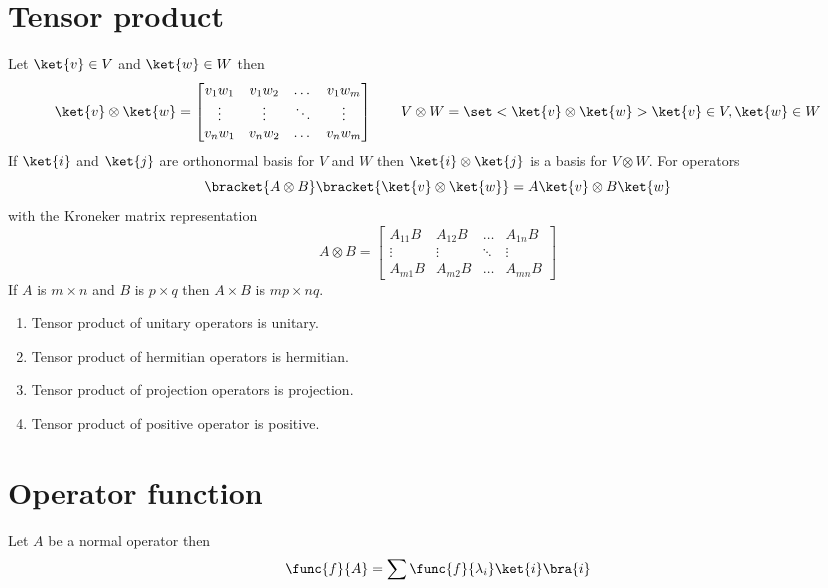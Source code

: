 \section{Tensor product}
Let \(\ket{v} \in V\) and \(\ket{w} \in W\) then 
\begin{equation*}
    \ket{v} \otimes \ket{w} = \begin{bmatrix}
        v_1w_1 & v_1w_2 & \dots & v_1w_m \\
        \vdots & \vdots & \ddots & \vdots\\
        v_nw_1 & v_nw_2 & \dots & v_nw_m
    \end{bmatrix}
    \qquad V \otimes W = \set<\ket{v} \otimes \ket{w}>{\ket{v} \in V, \ket{w} \in W}
\end{equation*}
If \(\ket{i}\) and \(\ket{j}\) are orthonormal basis for \(V\) and \(W\) then \(\ket{i} \otimes \ket{j}\) is a basis for \(V \otimes W\). For operators 
\begin{equation*}
    \bracket{A \otimes B } \bracket{\ket{v} \otimes \ket{w}} = A \ket{v} \otimes B \ket{w}
\end{equation*}
with the Kroneker matrix representation
\begin{equation*}
    A \otimes B = \begin{bmatrix}
        A_{11}B & A_{12}B & \dots & A_{1n}B \\
        \vdots & \vdots & \ddots & \vdots\\
        A_{m1}B & A_{m2}B & \dots & A_{mn}B
    \end{bmatrix}
\end{equation*}
If \(A\) is \(m \times n \) and \(B\) is \(p \times q\) then \(A \times B\) is \(mp \times nq\).
\begin{proposition}
    \begin{enumerate}
        \item Tensor product of unitary operators is unitary.
        \item Tensor product of hermitian operators is hermitian.
        \item Tensor product of projection operators is projection.
        \item Tensor product of positive operator is positive.
    \end{enumerate}
\end{proposition}
\section{Operator function}
Let \(A\) be a normal operator then 
\begin{equation*}
    \func{f}{A} = \sum \func{f}{\lambda_i} \ket{i}\bra{i}
\end{equation*}

